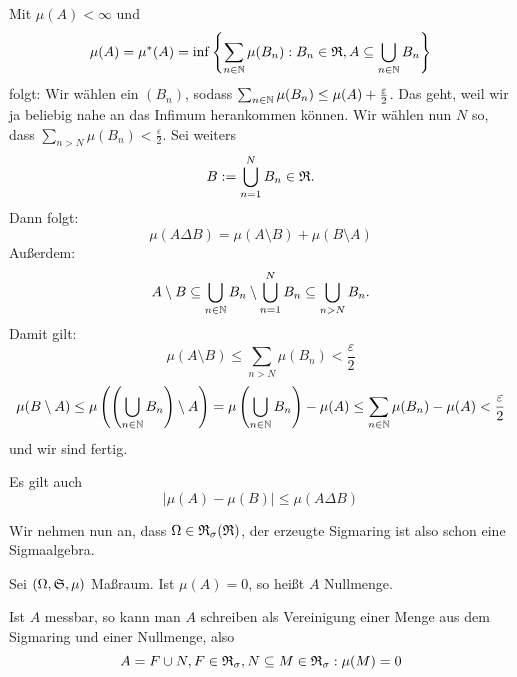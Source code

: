 			\begin{bew}
				Mit $\mu(A)<\infty$ und
				\[ \mu(A)=\mu^*(A)=\inf\left\{\sum_{n\in\mathbb{N}}\mu(B_n): B_n\in\mathfrak{R}, A\subseteq \bigcup_{n\in\mathbb{N}} B_n\right\} \]
				folgt: Wir wählen ein $(B_n)$, sodass $\sum_{n\in\mathbb{N}} \mu(B_n)\le \mu(A)+\frac{\varepsilon}{2}$. Das geht, weil wir ja beliebig nahe an das Infimum herankommen können. Wir wählen nun $N$ so, dass $\sum_{n>N}\mu(B_n)<\frac{\varepsilon}{2}$. Sei weiters
				\[ B:=\bigcup_{n=1}^N B_n\in\mathfrak{R}. \]
				Dann folgt:
				\[ \mu(A\Delta B)=\mu (A\setminus B)+\mu(B\setminus A) \]
				Außerdem:
				\[ A\setminus B\subseteq\bigcup_{n\in\mathbb{N}} B_n\setminus \bigcup_{n=1}^N B_n\subseteq \bigcup_{n>N}B_n. \]
				Damit gilt:
				\[ \mu(A\setminus B)\le\sum_{n>N} \mu(B_n)<\frac{\varepsilon}{2} \]
				\[ \mu(B\setminus A)\le \mu\left(\left(\bigcup_{n\in\mathbb{N}} B_n\right)\setminus A\right)=\mu\left(\bigcup_{n\in\mathbb{N}} B_n\right)-\mu(A)\le \sum_{n\in\mathbb{N}} \mu(B_n)-\mu(A)<\frac{\varepsilon}{2} \]
				und wir sind fertig. 
			\end{bew}
			
			\begin{bem}
				Es gilt auch 
				\[ |\mu(A)-\mu(B)|\le \mu(A\Delta B) \]
			\end{bem}
			
			\begin{bem}
				Wir nehmen nun an, dass $\Omega\in\mathfrak{R}_\sigma(\mathfrak{R})$, der erzeugte Sigmaring ist also schon eine Sigmaalgebra. 
			\end{bem}
			
			
			\begin{defi}
				Sei $(\Omega, \mathfrak{S}, \mu)$ Maßraum. Ist $\mu(A)=0$, so heißt $A$ Nullmenge.
				
			\end{defi}
			
			\begin{satz}
				Ist $A$ messbar, so kann man $A$ schreiben als Vereinigung einer Menge aus dem Sigmaring und einer Nullmenge, also
				\[ A=F\cup N, F\in\mathfrak{R}_\sigma, N\subseteq M\in\mathfrak{R}_\sigma:\mu(M)=0 \]
			\end{satz}
			
